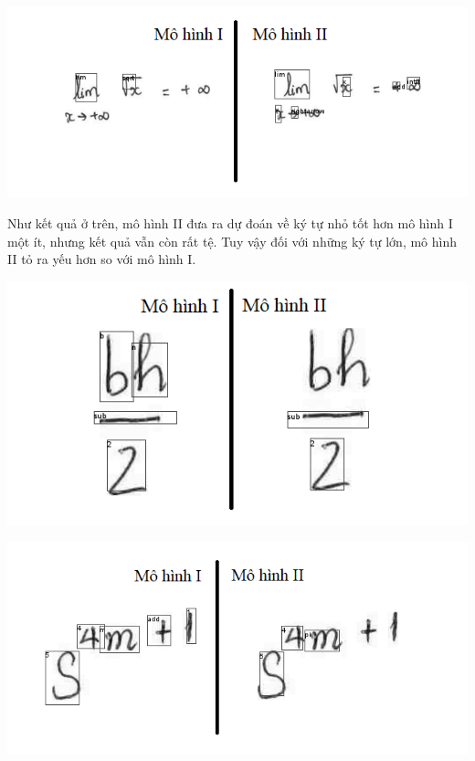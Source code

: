 \documentclass[a4paper,12pt]{article}
\begin{document}
	\begin{center}
		\centering
		\includegraphics[width=0.775\linewidth]{compare_2.png}
		\vspace{0.5cm}
		
	\end{center}
	
	Như kết quả ở trên, mô hình II đưa ra dự đoán về ký tự nhỏ tốt hơn mô hình I một ít, nhưng kết quả vẫn còn rất tệ. Tuy vậy đối với những ký tự lớn, mô hình II tỏ ra yếu hơn so với mô hình I.
	
	\begin{center}
		\centering
		\includegraphics[width=0.775\linewidth]{compare_3.png}
		\vspace{0.5cm}
		
	\end{center}
	
	\begin{center}
		\centering
		\includegraphics[width=0.775\linewidth]{compare_4.png}
		\vspace{0.5cm}
		
	\end{center}
	
\end{document}

